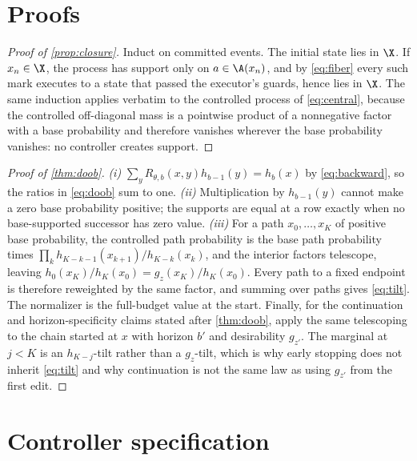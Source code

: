 \section{Proofs}
\label{app:proofs}

\begin{proof}[Proof of \cref{prop:closure}]
Induct on committed events. The initial state lies in $\X$. If $x_n\in\X$, the process has support only on $a\in\A(x_n)$, and by \eqref{eq:fiber} every such mark executes to a state that passed the executor's guards, hence lies in $\X$. The same induction applies verbatim to the controlled process of \eqref{eq:central}, because the controlled off-diagonal mass is a pointwise product of a nonnegative factor with a base probability and therefore vanishes wherever the base probability vanishes: no controller creates support.
\end{proof}

\begin{proof}[Proof of \cref{thm:doob}]
\emph{(i)} $\sum_y R_{\theta,b}(x,y)h_{b-1}(y)=h_b(x)$ by \eqref{eq:backward}, so the ratios in \eqref{eq:doob} sum to one.
\emph{(ii)} Multiplication by $h_{b-1}(y)$ cannot make a zero base probability positive; the supports are equal at a row exactly when no base-supported successor has zero value.
\emph{(iii)} For a path $x_0,\dots,x_K$ of positive base probability, the controlled path probability is the base path probability times $\prod_{k}h_{K-k-1}(x_{k+1})/h_{K-k}(x_k)$, and the interior factors telescope, leaving $h_0(x_K)/h_K(x_0)=g_z(x_K)/h_K(x_0)$. Every path to a fixed endpoint is therefore reweighted by the same factor, and summing over paths gives \eqref{eq:tilt}. The normalizer is the full-budget value at the start.
Finally, for the continuation and horizon-specificity claims stated after \cref{thm:doob}, apply the same telescoping to the chain started at $x$ with horizon $b'$ and desirability $g_{z'}$. The marginal at $j<K$ is an $h_{K-j}$-tilt rather than a $g_z$-tilt, which is why early stopping does not inherit \eqref{eq:tilt} and why continuation is not the same law as using $g_{z'}$ from the first edit.
\end{proof}

\section{Controller specification}
\label{app:controller}

